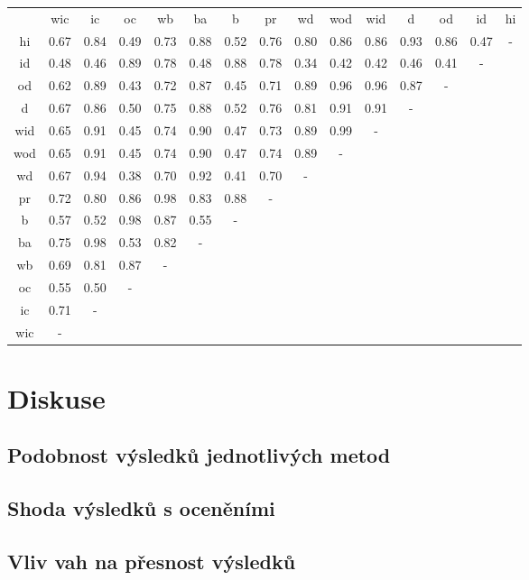 \documentclass[12pt,titlepage]{report}
\begin{document}
\begin{footnotesize}
\begin{center}
\begin{tabular}{|c|c|c|c|c|c|c|c|c|c|c|c|c|c|c|}
& wic & ic & oc & wb & ba & b & pr & wd & wod & wid & d & od & id & hi \\
hi & 0.67 & 0.84 & 0.49 & 0.73 & 0.88 & 0.52 & 0.76 & 0.80 & 0.86 & 0.86 & 0.93 & 0.86 & 0.47 & - \\
id & 0.48 & 0.46 & 0.89 & 0.78 & 0.48 & 0.88 & 0.78 & 0.34 & 0.42 & 0.42 & 0.46 & 0.41 & - \\
od & 0.62 & 0.89 & 0.43 & 0.72 & 0.87 & 0.45 & 0.71 & 0.89 & 0.96 & 0.96 & 0.87 & - \\
d  & 0.67 & 0.86 & 0.50 & 0.75 & 0.88 & 0.52 & 0.76 & 0.81 & 0.91 & 0.91 & - \\
wid& 0.65 & 0.91 & 0.45 & 0.74 & 0.90 & 0.47 & 0.73 & 0.89 & 0.99 & - \\
wod& 0.65 & 0.91 & 0.45 & 0.74 & 0.90 & 0.47 & 0.74 & 0.89 & - \\
wd & 0.67 & 0.94 & 0.38 & 0.70 & 0.92 & 0.41 & 0.70 & - \\
pr & 0.72 & 0.80 & 0.86 & 0.98 & 0.83 & 0.88 & - \\
b  & 0.57 & 0.52 & 0.98 & 0.87 & 0.55 & - \\
ba & 0.75 & 0.98 & 0.53 & 0.82 & - \\
wb & 0.69 & 0.81 & 0.87 & - \\
oc & 0.55 & 0.50 & - \\
ic & 0.71 & - \\
wic&  - \\
\end{tabular}
\end{center}
\end{footnotesize}

\chapter{Diskuse}
\section{Podobnost výsledků jednotlivých metod}
\section{Shoda výsledků s oceněními}
\section{Vliv vah na přesnost výsledků}
\end{document}
